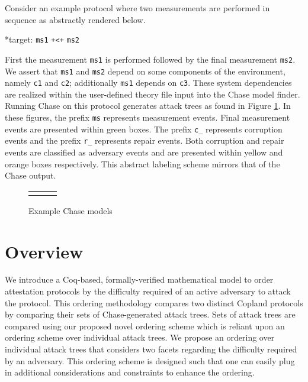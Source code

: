 \documentclass[runningheads]{llncs}
\theoremstyle{definition}
\begin{document}
Consider an example protocol where two measurements are performed in sequence as abstractly rendered below.

\begin{center}
    *target: \texttt{ms1} \texttt{+<+} \texttt{ms2}
\end{center}

\noindent First the measurement \texttt{ms1} is performed followed by the final measurement \texttt{ms2}. We assert that \texttt{ms1} and \texttt{ms2} depend on some components of the environment, namely \texttt{c1} and \texttt{c2}; additionally \texttt{ms1} depends on \texttt{c3}. These system dependencies are realized within the user-defined theory file input into the Chase model finder. Running Chase on this protocol generates attack trees as found in Figure \ref{fig:chase-ex}. In these figures, the prefix \texttt{ms} represents measurement events. Final measurement events are presented within green boxes. The prefix \texttt{c\_} represents corruption events and the prefix \texttt{r\_} represents repair events. Both corruption and repair events are classified as adversary events and are presented within yellow and orange boxes respectively. This abstract labeling scheme mirrors that of the Chase output.

\begin{figure}[hbtp]
    \centering 
    \begin{tabular}{m{3cm} m{3cm} m{3cm}}
         &  &  
    \end{tabular}
    \caption[Example Chase Models]{Example Chase models}
    \label{fig:chase-ex}
\end{figure}




\section{Overview}
We introduce a Coq-based, formally-verified mathematical model to order attestation protocols by the difficulty required of an active adversary to attack the protocol. This ordering methodology compares two distinct Copland protocols by comparing their sets of Chase-generated attack trees. Sets of attack trees are compared using our proposed novel ordering scheme which is reliant upon an ordering scheme over individual attack trees. We propose an ordering over individual attack trees that considers two facets regarding the difficulty required by an adversary. This ordering scheme is designed such that one can easily plug in additional considerations and constraints to enhance the ordering.
\end{document}
